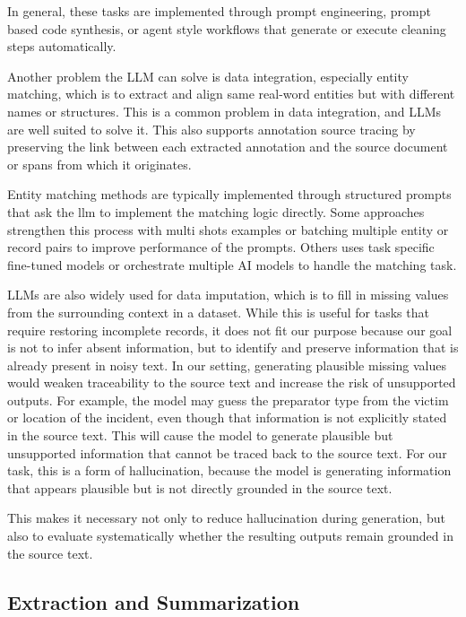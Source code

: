 \documentclass{article}
\begin{document}
In general, these tasks are implemented through prompt engineering, prompt based code synthesis, or agent style workflows that generate or execute cleaning steps automatically. 

Another problem the LLM can solve is data integration, especially entity matching, which is to extract and align same real-word entities but with different names or structures. This is a common problem in data integration, and LLMs are well suited to solve it. This also supports annotation source tracing by preserving the link between each extracted annotation and the source document or spans from which it originates.

Entity matching methods are typically implemented through structured prompts that ask the llm to implement the matching logic directly. Some approaches strengthen this process with multi shots examples or batching multiple entity or record pairs to improve performance of the prompts. Others uses task specific fine-tuned models or orchestrate multiple AI models to handle the matching task.

LLMs are also widely used for data imputation, which is to fill in missing values from the surrounding context in a dataset. While this is useful for tasks that require restoring incomplete records, it does not fit our purpose because our goal is not to infer absent information, but to identify and preserve information that is already present in noisy text. In our setting, generating plausible missing values would weaken traceability to the source text and increase the risk of unsupported outputs. For example, the model may guess the preparator type from the victim or location of the incident, even though that information is not explicitly stated in the source text. This will cause the model to generate plausible but unsupported information that cannot be traced back to the source text. For our task, this is a form of hallucination, because the model is generating information that appears plausible but is not directly grounded in the source text.

This makes it necessary not only to reduce hallucination during generation, but also to evaluate systematically whether the resulting outputs remain grounded in the source text.

\subsection{Extraction and
Summarization}\label{extraction-and-summarization}
\end{document}
